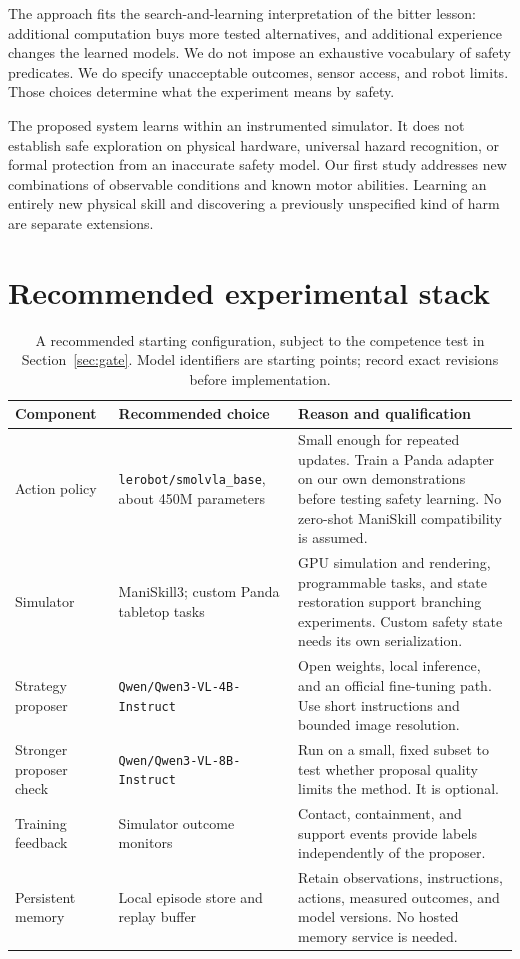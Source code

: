 \documentclass[11pt]{article}
\begin{document}
The approach fits the search-and-learning interpretation of the bitter lesson: additional computation buys more tested alternatives, and additional experience changes the learned models. We do not impose an exhaustive vocabulary of safety predicates. We do specify unacceptable outcomes, sensor access, and robot limits. Those choices determine what the experiment means by safety.

The proposed system learns within an instrumented simulator. It does not establish safe exploration on physical hardware, universal hazard recognition, or formal protection from an inaccurate safety model. Our first study addresses new combinations of observable conditions and known motor abilities. Learning an entirely new physical skill and discovering a previously unspecified kind of harm are separate extensions.

\section{Recommended experimental stack}

\begin{table}[htbp]
\centering\small
\begin{tabularx}{\textwidth}{@{}p{}p{}Y@{}}
\toprule
Component & Recommended choice & Reason and qualification \\
\midrule
Action policy & \texttt{lerobot/smolvla\_base}, about 450M parameters & Small enough for repeated updates. Train a Panda adapter on our own demonstrations before testing safety learning. No zero-shot ManiSkill compatibility is assumed. \\
Simulator & ManiSkill3; custom Panda tabletop tasks & GPU simulation and rendering, programmable tasks, and state restoration support branching experiments. Custom safety state needs its own serialization. \\
Strategy proposer & \texttt{Qwen/Qwen3-VL-4B-Instruct} & Open weights, local inference, and an official fine-tuning path. Use short instructions and bounded image resolution. \\
Stronger proposer check & \texttt{Qwen/Qwen3-VL-8B-Instruct} & Run on a small, fixed subset to test whether proposal quality limits the method. It is optional. \\
Training feedback & Simulator outcome monitors & Contact, containment, and support events provide labels independently of the proposer. \\
Persistent memory & Local episode store and replay buffer & Retain observations, instructions, actions, measured outcomes, and model versions. No hosted memory service is needed. \\
\bottomrule
\end{tabularx}
\caption{A recommended starting configuration, subject to the competence test in Section~\ref{sec:gate}. Model identifiers are starting points; record exact revisions before implementation.}
\end{table}
\end{document}
